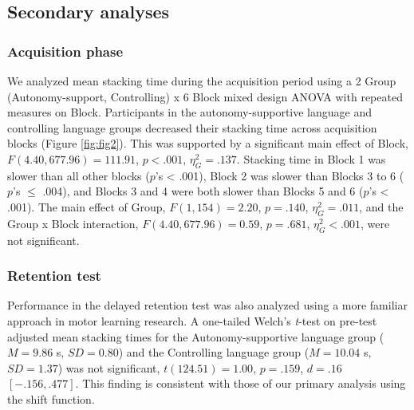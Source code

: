 \documentclass[man,floatsintext,donotrepeattitle,letterpaper,12pt]{apa7}
\begin{document}
\clearpage

\subsection{Secondary analyses}

\subsubsection{Acquisition phase}

We analyzed mean stacking time during the acquisition period using a 2 Group (Autonomy-support, Controlling) x 6 Block mixed design ANOVA with repeated measures on Block. Participants in the autonomy-supportive language and controlling language groups decreased their stacking time across acquisition blocks (Figure \ref{fig:fig2}). This was supported by a significant main effect of Block, $F(4.40, 677.96) = 111.91$, $p < .001$, $\eta_{G}^2 = .137$. Stacking time in Block 1 was slower than all other blocks ($p$'s < .001), Block 2 was slower than Blocks 3 to 6 ($p$'s $\leq$ .004), and Blocks 3 and 4 were both slower than Blocks 5 and 6 ($p$'s < .001). The main effect of Group, $F(1, 154) = 2.20$, $p = .140$, $\eta_{G}^2 = .011$, and the Group x Block interaction, $F(4.40, 677.96) = 0.59$, $p = .681$, $\eta_{G}^2 < .001$, were not significant.

\subsubsection{Retention test}

Performance in the delayed retention test was also analyzed using a more familiar approach in motor learning research. A one-tailed Welch's \emph{t}-test on pre-test adjusted mean stacking times for the Autonomy-supportive language group ($M = 9.86$ s, $SD = 0.80$) and the Controlling language group ($M = 10.04$ s, $SD = 1.37$) was not significant, $t(124.51) = 1.00$, $p = .159$, $d = .16$ $[-.156, .477]$. This finding is consistent with those of our primary analysis using the shift function.

\clearpage
\end{document}
